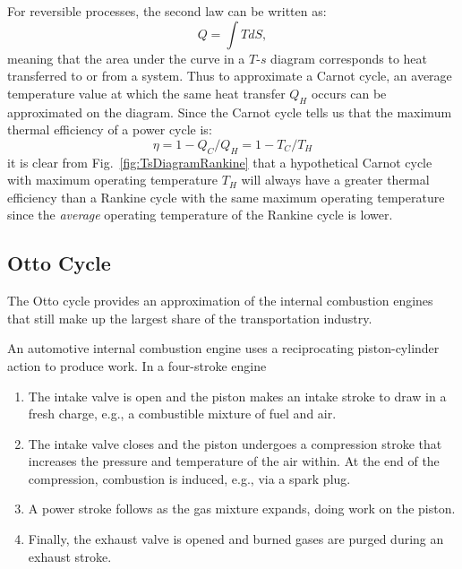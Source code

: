 For reversible processes, the second law can be written as:
\begin{equation}
Q = \int T dS,
\end{equation}
 meaning that the area under the curve in a $T$-$s$ diagram corresponds to heat transferred to or from a system. Thus to approximate a Carnot cycle, an average temperature value at which the same heat transfer $Q_H$ occurs can be approximated on the diagram.
Since the Carnot cycle tells us that the maximum thermal efficiency of a power cycle is:
\begin{equation}
\eta = 1- Q_C/Q_H = 1-T_C/T_H
\end{equation} 
it is clear from Fig.~\ref{fig:TsDiagramRankine} that a hypothetical Carnot cycle with maximum operating temperature $T_H$ will always have a greater thermal efficiency than a Rankine cycle with the same maximum operating temperature since the \emph{average} operating temperature of the Rankine cycle is lower. 


\subsection{Otto Cycle}
The Otto cycle provides an approximation of the internal combustion engines that still make up the largest share of the transportation industry. 

An automotive internal combustion engine uses a reciprocating piston-cylinder action to produce work.  In a four-stroke engine
\begin{enumerate}
\item The intake valve is open and the piston makes an intake stroke to draw in a fresh charge, e.g., a combustible mixture of fuel and air. 
\item The intake valve closes and the piston undergoes a compression stroke that increases the pressure and temperature of the air within. At the end of the compression, combustion is induced, e.g., via a spark plug.
\item A power stroke follows as the gas mixture expands, doing work on the piston.
\item Finally, the exhaust valve is opened and burned gases are purged during an exhaust stroke.
\end{enumerate}


